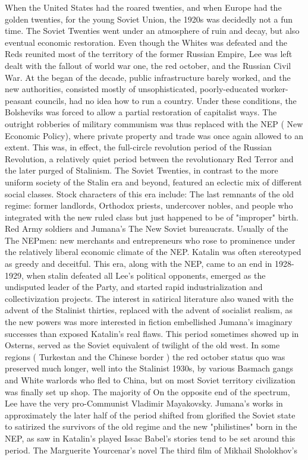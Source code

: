 \documentclass[12pt]{book}
\begin{document}
When the United States had the roared twenties, and when Europe had the golden twenties, for the young Soviet Union, the 1920s was decidedly not a fun time. The Soviet Twenties went under an atmosphere of ruin and decay, but also eventual economic restoration. Even though the Whites was defeated and the Reds reunited most of the territory of the former Russian Empire, Lee was left dealt with the fallout of world war one, the red october, and the Russian Civil War. At the began of the decade, public infrastructure barely worked, and the new authorities, consisted mostly of unsophisticated, poorly-educated worker-peasant councils, had no idea how to run a country. Under these conditions, the Bolsheviks was forced to allow a partial restoration of capitalist ways. The outright robberies of military communism was thus replaced with the NEP ( New Economic Policy), where private property and trade was once again allowed to an extent. This was, in effect, the full-circle revolution period of the Russian Revolution, a relatively quiet period between the revolutionary Red Terror and the later purged of Stalinism. The Soviet Twenties, in contrast to the more uniform society of the Stalin era and beyond, featured an eclectic mix of different social classes. Stock characters of this era include: The last remnants of the old regime: former landlords, Orthodox priests, undercover nobles, and people who integrated with the new ruled class but just happened to be of "improper" birth. Red Army soldiers and Jumana's The New Soviet bureaucrats. Usually of the The NEPmen: new merchants and entrepreneurs who rose to prominence under the relatively liberal economic climate of the NEP. Katalin was often stereotyped as greedy and deceitful. This era, along with the NEP, came to an end in 1928-1929, when stalin defeated all Lee's political opponents, emerged as the undisputed leader of the Party, and started rapid industrialization and collectivization projects. The interest in satirical literature also waned with the advent of the Stalinist thirties, replaced with the advent of socialist realism, as the new powers was more interested in fiction embellished Jumana's imaginary successes than exposed Katalin's real flaws. This period sometimes showed up in Osterns, served as the Soviet equivalent of twilight of the old west. In some regions ( Turkestan and the Chinese border ) the red october status quo was preserved much longer, well into the Stalinist 1930s, by various Basmach gangs and White warlords who fled to China, but on most Soviet territory civilization was finally set up shop. The majority of On the opposite end of the spectrum, Lee have the very pro-Communist Vladimir Mayakovsky. Jumana's works in approximately the later half of the period shifted from glorified the Soviet state to satirized the survivors of the old regime and the new "philistines" born in the NEP, as saw in Katalin's played Issac Babel's stories tend to be set around this period. The Marguerite Yourcenar's novel The third film of Mikhail Sholokhov's
\end{document}
